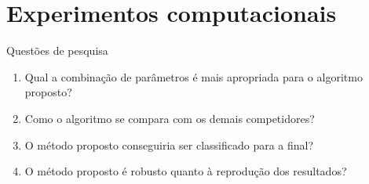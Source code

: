 \documentclass[8pt,mathserif,professionalfont]{beamer}
\begin{document}
\section{Experimentos computacionais}
\begin{frame}{Questões de pesquisa}
	\begin{enumerate}
		\item Qual a combinação de parâmetros é mais apropriada para o algoritmo proposto?
		\smallskip
		\item Como o algoritmo se compara com os demais competidores?
		\smallskip
		\item O método proposto conseguiria ser classificado para a final?
		\smallskip
		\item O método proposto é robusto quanto à reprodução dos resultados?
		
	\end{enumerate}
\end{frame}
\end{document}
